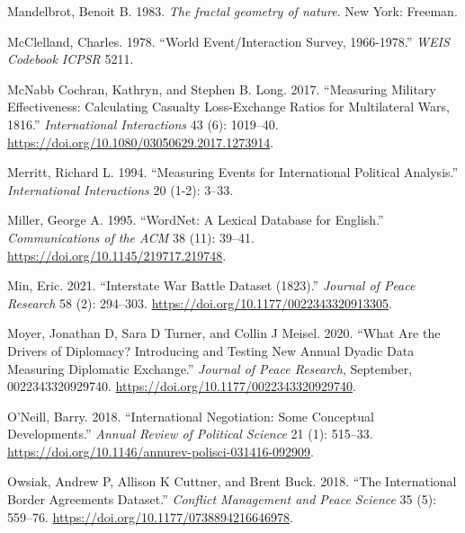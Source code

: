 \documentclass{article}
\newlength{\cslhangindent}
\newlength{\cslentryspacingunit} %
\newenvironment{CSLReferences}[2] %
 {%
  \setlength{\parindent}{0pt}
  \ifodd #1
  \let\oldpar\par
  \def\par{\hangindent=\cslhangindent\oldpar}
  \fi
  \setlength{\parskip}{#2\cslentryspacingunit}
 }%
 {}
\begin{document}
\begin{CSLReferences}{1}{0}
\leavevmode{}%
Mandelbrot, Benoit B. 1983. \emph{{The fractal geometry of nature}}.
{New York}: {Freeman}.

\leavevmode{}%
McClelland, Charles. 1978. {``World Event/Interaction Survey,
1966-1978.''} \emph{WEIS Codebook ICPSR} 5211.

\leavevmode{}%
McNabb Cochran, Kathryn, and Stephen B. Long. 2017. {``Measuring
{Military Effectiveness}: {Calculating Casualty Loss-Exchange Ratios}
for {Multilateral Wars}, 1816.''} \emph{International
Interactions} 43 (6): 1019--40.
\url{https://doi.org/10.1080/03050629.2017.1273914}.

\leavevmode{}%
Merritt, Richard L. 1994. {``Measuring Events for International
Political Analysis.''} \emph{International Interactions} 20 (1-2):
3--33.

\leavevmode{}%
Miller, George A. 1995. {``{WordNet}: A Lexical Database for
{English}.''} \emph{Communications of the ACM} 38 (11): 39--41.
\url{https://doi.org/10.1145/219717.219748}.

\leavevmode{}%
Min, Eric. 2021. {``Interstate {War Battle} Dataset
(1823).''} \emph{Journal of Peace Research} 58 (2):
294--303. \url{https://doi.org/10.1177/0022343320913305}.

\leavevmode{}%
Moyer, Jonathan D, Sara D Turner, and Collin J Meisel. 2020. {``What Are
the Drivers of Diplomacy? {Introducing} and Testing New Annual Dyadic
Data Measuring Diplomatic Exchange.''} \emph{Journal of Peace Research},
September, 0022343320929740.
\url{https://doi.org/10.1177/0022343320929740}.

\leavevmode{}%
O'Neill, Barry. 2018. {``International {Negotiation}: {Some Conceptual
Developments}.''} \emph{Annual Review of Political Science} 21 (1):
515--33. \url{https://doi.org/10.1146/annurev-polisci-031416-092909}.

\leavevmode{}%
Owsiak, Andrew P, Allison K Cuttner, and Brent Buck. 2018. {``The
{International Border Agreements Dataset}.''} \emph{Conflict Management
and Peace Science} 35 (5): 559--76.
\url{https://doi.org/10.1177/0738894216646978}.


\end{CSLReferences}
\end{document}
